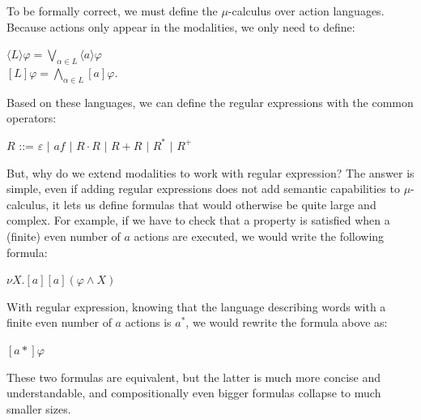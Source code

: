 \documentclass[11pt]{article}
\theoremstyle{definition}
\theoremstyle{plain}
\theoremstyle{definition}
\let\temp\phi
\let\phi\varphi
\let\varphi\temp
\begin{document}
To be formally correct, we must define the $ \mu $-calculus over action languages. Because actions only appear in the modalities, we only need to define:
\begin{center}
	$ \langle L\rangle\phi = \bigvee_{\alpha\in L} \langle a\rangle\phi $\\
	$ [L]\phi = \bigwedge_{\alpha\in L}[a]\phi $.
\end{center}
Based on these languages, we can define the regular expressions with the common operators:
\begin{center}
	$ R $ ::= $\varepsilon$ $ \vert $ $af$ $ \vert $ $R\cdot R$ $ \vert $ $ R + R$ $ \vert $ $R^* $ $ \vert $ $R^+$
\end{center}

But, why do we extend modalities to work with regular expression? The answer is simple, even if adding regular expressions does not add semantic capabilities to $ \mu $-calculus, it lets us define formulas that would otherwise be quite large and complex. For example, if we have to check that a property is satisfied when a (finite) even number of $ a $ actions are executed, we would write the following formula:

\begin{center}
	$ \nu X.[a][a](\phi\wedge X)$
\end{center}

With regular expression, knowing that the language describing words with a finite even number of $ a $ actions is $ a^* $, we would rewrite the formula above as:

\begin{center}
	$ [a*]\phi $
\end{center}

These two formulas are equivalent, but the latter is much more concise and understandable, and compositionally even bigger formulas collapse to much smaller sizes.
\end{document}

